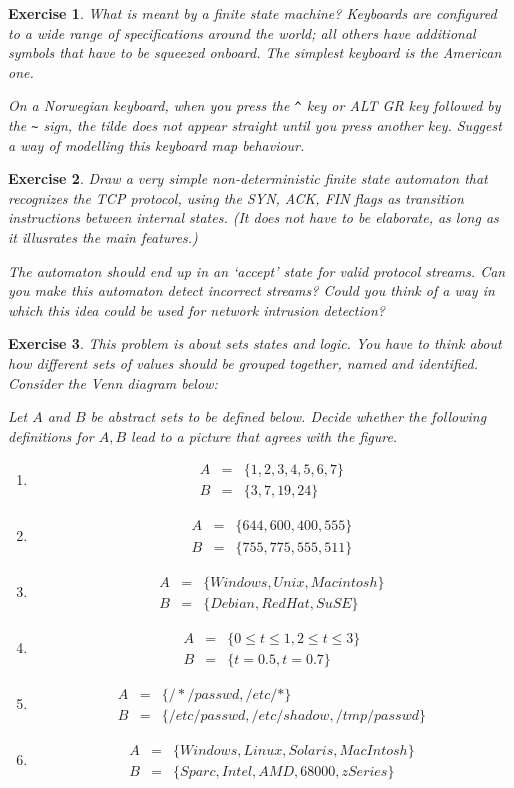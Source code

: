 \documentclass{book}
\newtheorem{exercise}{Exercise}
\def\beq{\begin{eqnarray}}
\def\eeq{\end{eqnarray}}
\begin{document}
\begin{exercise} 
What is meant by a finite state machine? Keyboards are configured to a
wide range of specifications around the world; all others have
additional symbols that have to be squeezed onboard.  The simplest
keyboard is the American one.  

On a Norwegian keyboard, when you press the
\verb+^+ key or
ALT GR key followed by the \verb+~+ sign, the tilde does not appear
straight until you press another key. Suggest a way of modelling this
keyboard map behaviour.
\end{exercise}
\begin{solution}
\end{solution}


\begin{exercise} 
Draw a very simple non-deterministic finite state automaton that
recognizes the TCP protocol, using the SYN, ACK, FIN flags as
transition instructions between internal states. (It does not have to
be elaborate, as long as it illusrates the main features.)

The automaton should end up in an `accept' state for valid protocol
streams. Can you make this automaton detect incorrect streams? Could
you think of a way in which this idea could be used for network
intrusion detection?
\end{exercise}
\begin{solution}
\end{solution}

\begin{exercise} 
This problem is about sets states and logic. You have to think about
how different sets of values should be grouped together, named and
identified. Consider the Venn diagram below:
\begin{figure}[ht]
\end{figure}
Let $A$ and $B$ be abstract sets to be defined below. Decide whether
the following definitions for $A,B$ lead to a picture that agrees with the
figure.
\begin{enumerate}
\item 
\beq
A &=&  \{1,2,3,4,5,6,7\}\nonumber\\
B &=&  \{3,7,19,24\}
\eeq
\item 
\beq
A &=&  \{644,600,400,555\}\nonumber\\
B &=&  \{755,775,555,511\}
\eeq
\item 
\beq
A &=&  \{Windows,Unix,Macintosh\}\nonumber\\
B &=&  \{Debian,RedHat,SuSE\}
\eeq
\item 
\beq
A &=&  \{ 0 \le t \le 1, 2 \le t \le 3\}\nonumber\\
B &=&  \{ t=0.5, t=0.7\}
\eeq
\item 
\beq
A &=&  \{ /*/passwd, /etc/* \}\nonumber\\
B &=&  \{ /etc/passwd, /etc/shadow, /tmp/passwd \}
\eeq
\item 
\beq
A &=&  \{Windows,Linux,Solaris,MacIntosh\}\nonumber\\
B &=&  \{Sparc,Intel,AMD,68000,zSeries\}
\eeq
\end{enumerate}
\end{exercise} 
\end{document}
